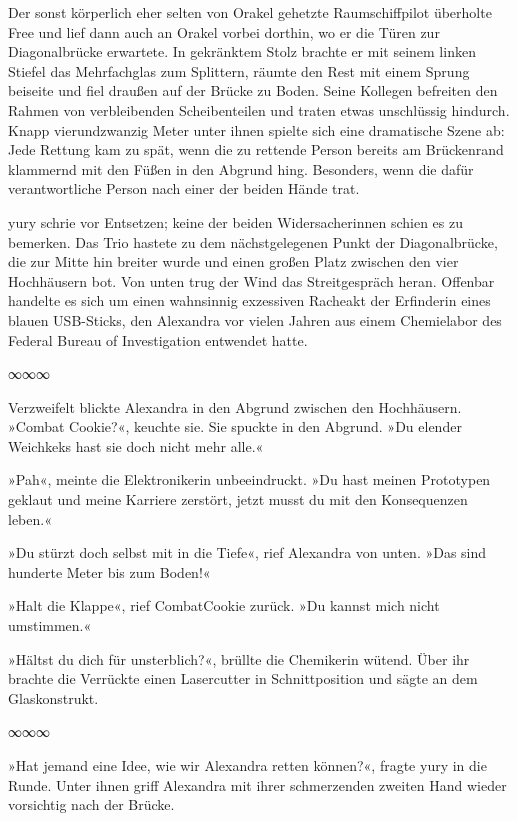 Der sonst körperlich eher selten von Orakel gehetzte Raumschiffpilot überholte Free und lief dann auch an Orakel vorbei dorthin, wo er die Türen zur Diagonalbrücke erwartete. In gekränktem Stolz brachte er mit seinem linken Stiefel das Mehrfachglas zum Splittern, räumte den Rest mit einem Sprung beiseite und fiel draußen auf der Brücke zu Boden. Seine Kollegen befreiten den Rahmen von verbleibenden Scheibenteilen und traten etwas unschlüssig hindurch. Knapp vierundzwanzig Meter unter ihnen spielte sich eine dramatische Szene ab: Jede Rettung kam zu spät, wenn die zu rettende Person bereits am Brückenrand klammernd mit den Füßen in den Abgrund hing. Besonders, wenn die dafür verantwortliche Person nach einer der beiden Hände trat.

yury schrie vor Entsetzen; keine der beiden Widersacherinnen schien es zu bemerken. Das Trio hastete zu dem nächstgelegenen Punkt der Diagonalbrücke, die zur Mitte hin breiter wurde und einen großen Platz zwischen den vier Hochhäusern bot. Von unten trug der Wind das Streitgespräch heran. Offenbar handelte es sich um einen wahnsinnig exzessiven Racheakt der Erfinderin eines blauen USB-Sticks, den Alexandra vor vielen Jahren aus einem Chemielabor des Federal Bureau of Investigation entwendet hatte.

\begin{center}
∞∞∞
\end{center}

Verzweifelt blickte Alexandra in den Abgrund zwischen den Hochhäusern. »Combat Cookie?«, keuchte sie. Sie spuckte in den Abgrund. »Du elender Weichkeks hast sie doch nicht mehr alle.«

»Pah«, meinte die Elektronikerin unbeeindruckt. »Du hast meinen Prototypen geklaut und meine Karriere zerstört, jetzt musst du mit den Konsequenzen leben.«

»Du stürzt doch selbst mit in die Tiefe«, rief Alexandra von unten. »Das sind hunderte Meter bis zum Boden!«

»Halt die Klappe«, rief CombatCookie zurück. »Du kannst mich nicht umstimmen.«

»Hältst du dich für unsterblich?«, brüllte die Chemikerin wütend. Über ihr brachte die Verrückte einen Lasercutter in Schnittposition und sägte an dem Glaskonstrukt.

\begin{center}
∞∞∞
\end{center}

»Hat jemand eine Idee, wie wir Alexandra retten können?«, fragte yury in die Runde. Unter ihnen griff Alexandra mit ihrer schmerzenden zweiten Hand wieder vorsichtig nach der Brücke.

